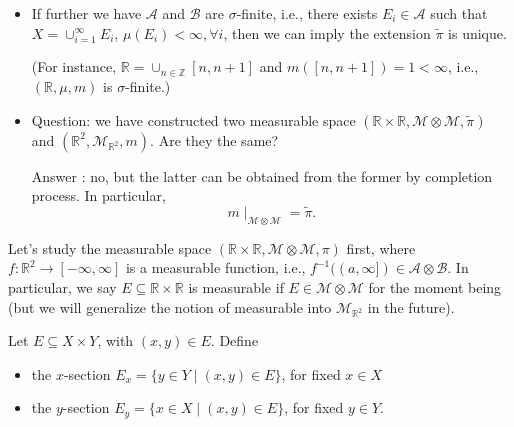 \begin{remark}
\begin{itemize}
\item
If further we have $\mathcal{A}$ and $\mathcal{B}$ are $\sigma$-finite, i.e., there exists $E_i\in\mathcal{A}$ such that $X=\cup_{i=1}^\infty E_i$, $\mu(E_i)<\infty,\forall i$, then we can imply the extension $\tilde{\pi}$ is unique.

(For instance, $\mathbb{R}=\cup_{n\in\mathbb{Z}}[n,n+1]$ and $m([n,n+1]) = 1<\infty$, i.e., $(\mathbb{R},\mu,m)$ is $\sigma$-finite.)
\item
Question: 
we have constructed two measurable space $(\mathbb{R}\times\mathbb{R},\mathcal{M}\otimes\mathcal{M},\tilde{\pi})$
and
$(\mathbb{R}^2,\mathcal{M}_{\mathbb{R}^2},m)$.
Are they the same?

Answer : no, but the latter can be obtained from the former by completion process.
In particular,
\[
m\mid_{\mathcal{M}\otimes\mathcal{M}}=\tilde{\pi}.
\]
\end{itemize}
\end{remark}

Let's study the measurable space $(\mathbb{R}\times\mathbb{R},\mathcal{M}\otimes\mathcal{M},\pi)$ first,
where $f:\mathbb{R}^2\to[-\infty,\infty]$ is a measurable function, i.e.,
$f^{-1}((a,\infty])\in\mathcal{A}\otimes\mathcal{B}$.
In particular, we say $E\subseteq \mathbb{R}\times\mathbb{R}$ is measurable if $E\in\mathcal{M}\otimes\mathcal{M}$ for the moment being (but we will generalize the notion of measurable into $\mathcal{M}_{\mathbb{R}^2}$ in the future).


\begin{definition}
Let $E\subseteq X\times Y$, with $(x,y)\in E$.
Define
\begin{itemize}
\item
the $x$-section $E_x = \{y\in Y\mid (x,y)\in E\}$, for fixed $x\in X$
\item
the $y$-section $E_y = \{x\in X\mid (x,y)\in E\}$, for fixed $y\in Y$.
\end{itemize}
\end{definition}

